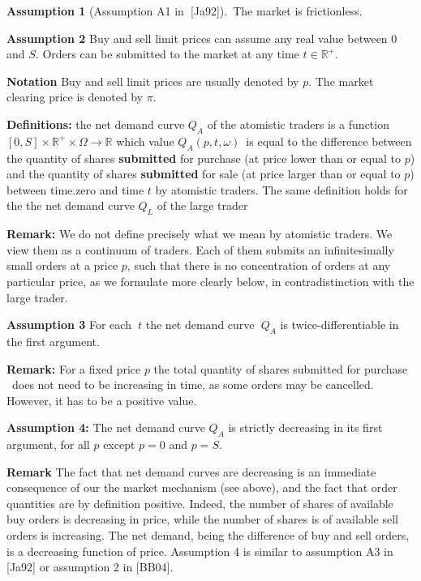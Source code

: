 \documentclass{article}
\begin{document}
\textbf{Assumption 1 }(Assumption A1 in\textbf{\ }[Ja92]).\ The market is
frictionless.

\bigskip

\textbf{Assumption 2 }Buy and sell limit prices can assume any real value
between $0$ and $S$. Orders can be submitted to the market at any time $t\in 
\mathbb{R}^{+}$.

\bigskip

\textbf{Notation} Buy and sell limit prices are usually denoted by $p$. The
market clearing price is denoted by $\pi $.

\bigskip

\textbf{Definitions: }the net demand curve $Q_{A}$ of the atomistic traders
is a function $[0,S]\times \mathbb{R}^{+}\times \Omega \mathbb{\rightarrow R}
$ which value $Q_{A}(p,t,\omega )$\ is equal to the difference between the
quantity of shares \textbf{submitted} for purchase (at price lower than or
equal to $p$) and the quantity of shares \textbf{submitted} for sale (at
price larger than or equal to $p$) between time.zero and time $t$ by
atomistic traders. The same definition holds for the the net demand curve $%
Q_{L}$ of the large trader

\bigskip

\textbf{Remark: }We do not define precisely what we mean by atomistic
traders. We view them as a continuum of traders. Each of them submits an
infinitesimally small orders at a price $p$, such that there is no
concentration of orders at any particular price, as we formulate more
clearly below, in contradistinction with the large trader.

\bigskip

\textbf{Assumption 3 }For each\textbf{\ }$t$ the net demand curve\textbf{\ }$%
Q_{A}$ is twice-differentiable in the first argument.

\bigskip

\textbf{Remark:} For a fixed price $p$ the total quantity of shares
submitted for purchase \ does not need to be increasing in time, as some
orders may be cancelled. However, it has to be a positive value.

\bigskip

\textbf{Assumption 4: }The net demand curve $Q_{A}$ is strictly decreasing
in its first argument, for all $p$ except $p=0$ and $p=S$.

\bigskip

\textbf{Remark} The fact that net demand curves are decreasing is an
immediate consequence of our the market mechanism (see above), and the fact
that order quantities are by definition positive. Indeed, the number of
shares of available buy orders is decreasing in price, while the number of
shares is of available sell orders is increasing. The net demand, being the
difference of buy and sell orders, is a decreasing function of price.
Assumption 4 is similar to assumption A3 in [Ja92] or assumption 2 in [BB04].
\end{document}
